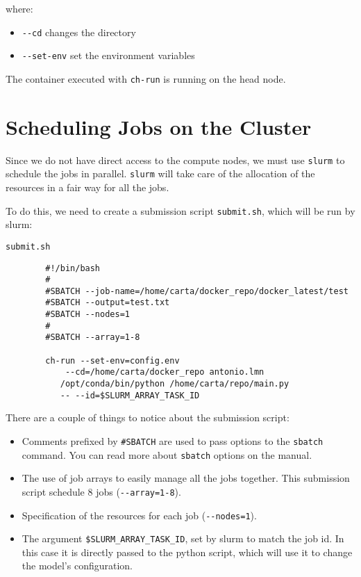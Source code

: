 \documentclass{article}
\begin{document}
    where:
    \begin{itemize}
        \item \verb!--cd! changes the directory
        \item \verb!--set-env! set the environment variables
    \end{itemize}

    The container executed with \verb!ch-run! is running on the head node.

    \section{Scheduling Jobs on the Cluster}
    Since we do not have direct access to the compute nodes, we must use \verb!slurm! to schedule the jobs in parallel. \verb!slurm! will take care of the allocation of the resources in a fair way for all the jobs.

    To do this, we need to create a submission script \verb!submit.sh!, which will be run by slurm:
    
    \verb!submit.sh!
    \begin{verbatim}
        #!/bin/bash
        #
        #SBATCH --job-name=/home/carta/docker_repo/docker_latest/test
        #SBATCH --output=test.txt
        #SBATCH --nodes=1
        #
        #SBATCH --array=1-8

        ch-run --set-env=config.env 
            --cd=/home/carta/docker_repo antonio.lmn 
           /opt/conda/bin/python /home/carta/repo/main.py 
           -- --id=$SLURM_ARRAY_TASK_ID
    \end{verbatim}

    There are a couple of things to notice about the submission script:
    \begin{itemize}
        \item Comments prefixed by \verb!#SBATCH! are used to pass options to the \verb!sbatch! command. You can read more about \verb!sbatch! options on the manual.
        \item The use of job arrays to easily manage all the jobs together. This submission script schedule 8 jobs (\verb!--array=1-8!).
        \item Specification of the resources for each job (\verb!--nodes=1!).
        \item The argument \verb!$SLURM_ARRAY_TASK_ID!, set by slurm to match the job id. In this case it is directly passed to the python script, which will use it to change the model's configuration.
    \end{itemize}
\end{document}
